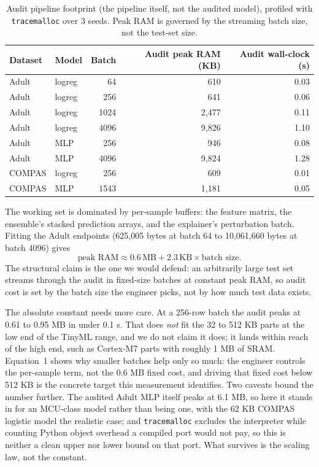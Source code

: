 \documentclass{article}
\begin{document}
\begin{table}[t]
  \caption{Audit pipeline footprint (the pipeline itself, not the audited model), profiled with \texttt{tracemalloc} over 3 seeds. Peak RAM is governed by the streaming batch size, not the test-set size.}
  \label{tab:footprint}
  \centering
  \begin{tabular}{llrrr}
    \toprule
    Dataset & Model & Batch & Audit peak RAM (KB) & Audit wall-clock (s) \\
    \midrule
    Adult  & logreg & 64   & 610   & 0.03 \\
    Adult  & logreg & 256  & 641   & 0.06 \\
    Adult  & logreg & 1024 & 2{,}477 & 0.11 \\
    Adult  & logreg & 4096 & 9{,}826 & 1.10 \\
    Adult  & MLP    & 256  & 946   & 0.08 \\
    Adult  & MLP    & 4096 & 9{,}824 & 1.28 \\
    COMPAS & logreg & 256  & 609   & 0.01 \\
    COMPAS & MLP    & 1543 & 1{,}181 & 0.05 \\
    \bottomrule
  \end{tabular}
\end{table}

The working set is dominated by per-sample buffers: the feature matrix, the ensemble's stacked prediction arrays, and the explainer's perturbation batch. Fitting the Adult endpoints (625{,}005 bytes at batch 64 to 10{,}061{,}660 bytes at batch 4096) gives
\begin{equation}
  \text{peak RAM} \approx 0.6\,\text{MB} + 2.3\,\text{KB} \times \text{batch size}.
\end{equation}
The structural claim is the one we would defend: an arbitrarily large test set streams through the audit in fixed-size batches at constant peak RAM, so audit cost is set by the batch size the engineer picks, not by how much test data exists.

The absolute constant needs more care. At a 256-row batch the audit peaks at 0.61 to 0.95 MB in under 0.1 s. That does \emph{not} fit the 32 to 512 KB parts at the low end of the TinyML range, and we do not claim it does; it lands within reach of the high end, such as Cortex-M7 parts with roughly 1 MB of SRAM. Equation~1 shows why smaller batches help only so much: the engineer controls the per-sample term, not the 0.6 MB fixed cost, and driving that fixed cost below 512 KB is the concrete target this measurement identifies. Two caveats bound the number further. The audited Adult MLP itself peaks at 6.1 MB, so here it stands in for an MCU-class model rather than being one, with the 62 KB COMPAS logistic model the realistic case; and \texttt{tracemalloc} excludes the interpreter while counting Python object overhead a compiled port would not pay, so this is neither a clean upper nor lower bound on that port. What survives is the scaling law, not the constant.
\end{document}
